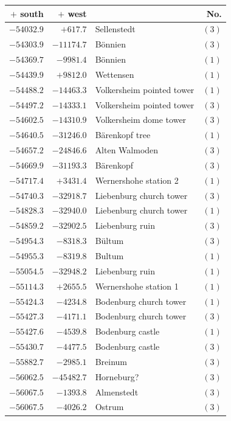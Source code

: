 \begin{center}\begingroup\fontsize{8}{9}\selectfont
\setlength{\tabcolsep}{4pt}
\begin{tabular}{r|r|p{170pt}|r}\hline
\(+\) south&\(+\) west&&No.\\\hline
\(-54032.9\)&\(+617.7\)&Sellenstedt&\((3)\)\\
\(-54303.9\)&\(-11174.7\)&Bönnien&\((3)\)\\
\(-54369.7\)&\(-9981.4\)&Bönnien&\((1)\)\\
\(-54439.9\)&\(+9812.0\)&Wettensen&\((1)\)\\
\(-54488.2\)&\(-14463.3\)&Volkersheim pointed tower&\((1)\)\\
\(-54497.2\)&\(-14333.1\)&Volkersheim pointed tower&\((3)\)\\
\(-54602.5\)&\(-14310.9\)&Volkersheim dome tower&\((3)\)\\
\(-54640.5\)&\(-31246.0\)&Bärenkopf tree&\((1)\)\\
\(-54657.2\)&\(-24846.6\)&Alten Walmoden&\((3)\)\\
\(-54669.9\)&\(-31193.3\)&Bärenkopf&\((3)\)\\
\(-54717.4\)&\(+3431.4\)&Wernershohe station 2&\((1)\)\\
\(-54740.3\)&\(-32918.7\)&Liebenburg church tower&\((3)\)\\
\(-54828.3\)&\(-32940.0\)&Liebenburg church tower&\((1)\)\\
\(-54859.2\)&\(-32902.5\)&Liebenburg ruin&\((3)\)\\
\(-54954.3\)&\(-8318.3\)&Bültum&\((3)\)\\
\(-54955.3\)&\(-8319.8\)&Bultum&\((1)\)\\
\(-55054.5\)&\(-32948.2\)&Liebenburg ruin&\((1)\)\\
\(-55114.3\)&\(+2655.5\)&Wernershohe station 1&\((1)\)\\
\(-55424.3\)&\(-4234.8\)&Bodenburg church tower&\((1)\)\\
\(-55427.3\)&\(-4171.1\)&Bodenburg church tower&\((3)\)\\
\(-55427.6\)&\(-4539.8\)&Bodenburg castle&\((1)\)\\
\(-55430.7\)&\(-4477.5\)&Bodenburg castle&\((3)\)\\
\(-55882.7\)&\(-2985.1\)&Breinum&\((3)\)\\
\(-56062.5\)&\(-45482.7\)&Horneburg?&\((3)\)\\
\(-56067.5\)&\(-1393.8\)&Almenstedt&\((3)\)\\
\(-56067.5\)&\(-4026.2\)&Ostrum&\((3)\)\\

\end{tabular}
\end{center}
